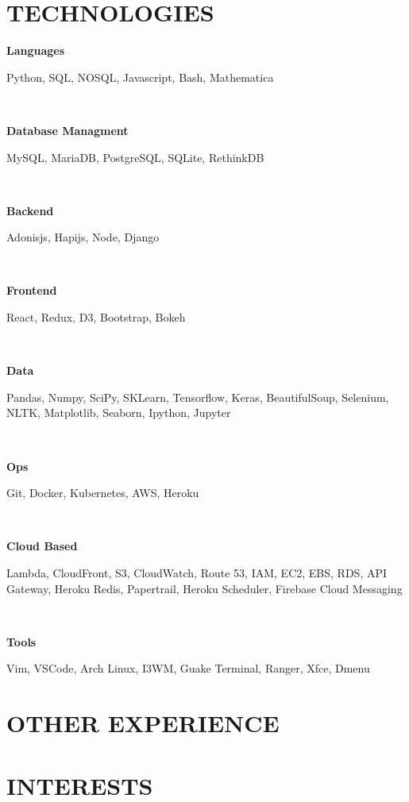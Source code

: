 \documentclass[12pt]{resume}
\begin{document}
    \begin{minipage}[t]{0.45\textwidth}
        {\section* {TECHNOLOGIES}}
        { \par \bf Languages }
        { \par Python, SQL, NOSQL, Javascript, Bash, Mathematica}\\
        { \par \bf Database Managment }
        { \par MySQL, MariaDB, PostgreSQL, SQLite, RethinkDB}\\
        { \par \bf Backend }
        { \par Adonisjs, Hapijs, Node, Django}\\
        { \par \bf Frontend }
        { \par React, Redux, D3, Bootstrap, Bokeh}\\
        { \par \bf Data }
        { \par Pandas, Numpy, SciPy, SKLearn, Tensorflow, Keras, 
        BeautifulSoup, Selenium, NLTK, Matplotlib, Seaborn, Ipython, Jupyter}\\
        { \par \bf Ops}
        { \par Git, Docker, Kubernetes, AWS, Heroku}\\
        { \par \bf Cloud Based}
        { \par Lambda, CloudFront, S3, CloudWatch, Route 53, IAM, EC2, EBS,
        RDS, API Gateway, Heroku Redis, Papertrail, Heroku Scheduler, Firebase
        Cloud Messaging}\\
        { \par \bf Tools }
        { \par Vim, VSCode, Arch Linux, I3WM, Guake Terminal, Ranger, Xfce,
        Dmenu}
        {\section* {OTHER EXPERIENCE}}
        {\section* {INTERESTS}}
    \end{minipage}
\end{document}
